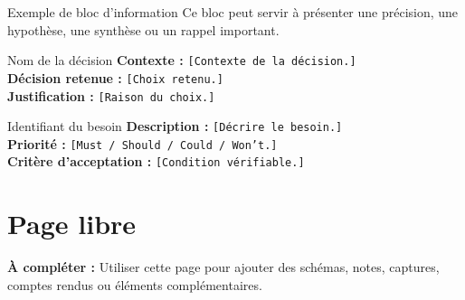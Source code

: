 \documentclass[11pt,a4paper]{report}
\newcommand{\placeholder}[1]{\textcolor{placeholderColor}{\texttt{[#1]}}}
\newcommand{\todo}[1]{\textcolor{todoColor}{\textbf{À compléter :} #1}}
\newcommand{\blankspace}[1]{\vspace*{#1}}
\begin{document}
\begin{infobox}{Exemple de bloc d'information}
Ce bloc peut servir à présenter une précision, une hypothèse, une synthèse ou un rappel important.
\end{infobox}

\begin{decisionbox}{Nom de la décision}
\textbf{Contexte :} \placeholder{Contexte de la décision.}\\
\textbf{Décision retenue :} \placeholder{Choix retenu.}\\
\textbf{Justification :} \placeholder{Raison du choix.}
\end{decisionbox}

\begin{requirementbox}{Identifiant du besoin}
\textbf{Description :} \placeholder{Décrire le besoin.}\\
\textbf{Priorité :} \placeholder{Must / Should / Could / Won't.}\\
\textbf{Critère d'acceptation :} \placeholder{Condition vérifiable.}
\end{requirementbox}

\section{Page libre}
\todo{Utiliser cette page pour ajouter des schémas, notes, captures, comptes rendus ou éléments complémentaires.}
\blankspace{14cm}
\end{document}
